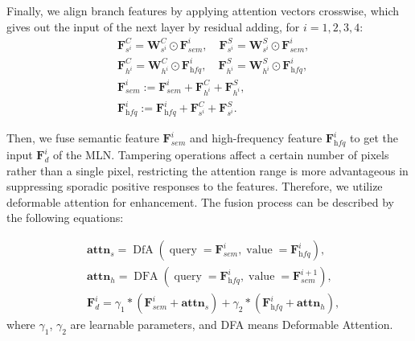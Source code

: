 \documentclass{article}
\begin{document}
Finally, we align branch features by applying attention vectors crosswise, which gives out the input of the next layer by residual adding, for $i=1,2,3,4$:
\begin{equation}
\begin{split}
& \mathbf F^C_{s^i} = \mathbf W^C_{s^i} \odot \mathbf F^{i}_{sem},\quad \mathbf F^S_{s^i} = \mathbf W^S_{s^i} \odot \mathbf F^{i}_{sem}, \\
& \mathbf F^C_{h^i} = \mathbf W^C_{h^i} \odot \mathbf F^{i}_{\textit{hfq}},\quad \mathbf F^S_{h^i} = \mathbf W^S_{h^i} \odot \mathbf F^{i}_{\textit{hfq}}, \\ 
& \mathbf F^{i}_{sem} := \mathbf F^{i}_{sem} + \mathbf F^C_{h^i} + \mathbf F^S_{h^i}, \\
& \mathbf F^{i}_{\textit{hfq}} := \mathbf F^{i}_{\textit{hfq}} + \mathbf F^C_{s^i} + \mathbf F^S_{s^i}.
\end{split}
\end{equation}

Then, we fuse semantic feature $\mathbf F^i_{sem}$ and high-frequency feature $\mathbf F^i_{\textit{hfq}}$ to get the input $\mathbf F_d^i$ of the MLN. 
Tampering operations affect a certain number of pixels rather than a single pixel, restricting the attention range is more advantageous in suppressing sporadic positive responses to the features. Therefore, we utilize deformable attention\cite{deformable} for enhancement. 
The fusion process can be described by the following equations:

\begin{equation}
\label{deform_att}
\begin{split}
&\mathbf {attn}_{s} = \operatorname{DfA}(\operatorname{query}=\mathbf F^{i}_{{sem}}, \operatorname{value}=\mathbf 
 F^{i}_{\textit{hfq}}), \\
&\mathbf {attn}_{h} = \operatorname{DFA}(\operatorname{query}=\mathbf F^{i}_{\textit{hfq}}, \operatorname{value}=\mathbf F^{i+1}_{{sem}}), \\
&\mathbf F_d^i = \gamma_1 * (\mathbf F^{i}_{{sem}} + \mathbf {attn}_{s}) + \gamma_2 * (\mathbf F^{i}_{\textit{hfq}} + \mathbf {attn}_{h}), 
\end{split}
\end{equation}
where $\gamma_1$, $\gamma_2$ are learnable parameters, and DFA means Deformable Attention.
\end{document}
